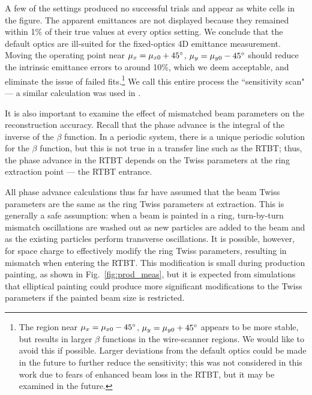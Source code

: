 A few of the settings produced no successful trials and appear as white cells in the figure. The apparent emittances are not displayed because they remained within 1\% of their true values at every optics setting. We conclude that the default optics are ill-suited for the fixed-optics 4D emittance measurement. Moving the operating point near $\mu_x = \mu_{x0} + 45\degree$, $\mu_y = \mu_{y0} - 45\degree$ should reduce the intrinsic emittance errors to around 10\%, which we deem acceptable, and eliminate the issue of failed fits.\footnote{The region near $\mu_x = \mu_{x0} - 45\degree$, $\mu_y = \mu_{y0} + 45\degree$ appears to be more stable, but results in larger $\beta$ functions in the wire-scanner regions. We would like to avoid this if possible. Larger deviations from the default optics could be made in the future to further reduce the sensitivity; this was not considered in this work due to fears of enhanced beam loss in the RTBT, but it may be examined in the future.} We call this entire process the ``sensitivity scan" — a similar calculation was used in \cite{Faus-Golfe2016}.

It is also important to examine the effect of mismatched beam parameters on the reconstruction accuracy. Recall that the phase advance is the integral of the inverse of the $\beta$ function. In a periodic system, there is a unique periodic solution for the $\beta$ function, but this is not true in a transfer line such as the RTBT; thus, the phase advance in the RTBT depends on the Twiss parameters at the ring extraction point — the RTBT entrance. 

All phase advance calculations thus far have assumed that the beam Twiss parameters are the same as the ring Twiss parameters at extraction. This is generally a safe assumption: when a beam is painted in a ring, turn-by-turn mismatch oscillations are washed out as new particles are added to the beam and as the existing particles perform transverse oscillations. It is possible, however, for space charge to effectively modify the ring Twiss parameters, resulting in mismatch when entering the RTBT. This modification is small during production painting, as shown in Fig.~\ref{fig:prod_meas}, but it is expected from simulations that elliptical painting could produce more significant modifications to the Twiss parameters if the painted beam size is restricted. 


